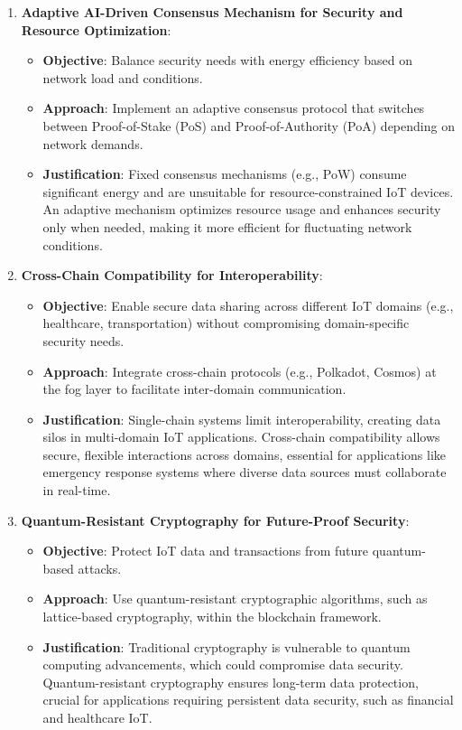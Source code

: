 \documentclass[12pt, oneside]{report}
\begin{document}
\begin{enumerate}
    \item \textbf{Adaptive AI-Driven Consensus Mechanism for Security and Resource Optimization}:
    \begin{itemize}
        \item \textbf{Objective}: Balance security needs with energy efficiency based on network load and conditions.
        \item \textbf{Approach}: Implement an adaptive consensus protocol that switches between Proof-of-Stake (PoS) and Proof-of-Authority (PoA) depending on network demands.
        \item \textbf{Justification}: Fixed consensus mechanisms (e.g., PoW) consume significant energy and are unsuitable for resource-constrained IoT devices. An adaptive mechanism optimizes resource usage and enhances security only when needed, making it more efficient for fluctuating network conditions.
    \end{itemize}

    \item \textbf{Cross-Chain Compatibility for Interoperability}:
    \begin{itemize}
        \item \textbf{Objective}: Enable secure data sharing across different IoT domains (e.g., healthcare, transportation) without compromising domain-specific security needs.
        \item \textbf{Approach}: Integrate cross-chain protocols (e.g., Polkadot, Cosmos) at the fog layer to facilitate inter-domain communication.
        \item \textbf{Justification}: Single-chain systems limit interoperability, creating data silos in multi-domain IoT applications. Cross-chain compatibility allows secure, flexible interactions across domains, essential for applications like emergency response systems where diverse data sources must collaborate in real-time.
    \end{itemize}

    \item \textbf{Quantum-Resistant Cryptography for Future-Proof Security}:
    \begin{itemize}
        \item \textbf{Objective}: Protect IoT data and transactions from future quantum-based attacks.
        \item \textbf{Approach}: Use quantum-resistant cryptographic algorithms, such as lattice-based cryptography, within the blockchain framework.
        \item \textbf{Justification}: Traditional cryptography is vulnerable to quantum computing advancements, which could compromise data security. Quantum-resistant cryptography ensures long-term data protection, crucial for applications requiring persistent data security, such as financial and healthcare IoT.
    \end{itemize}



\end{enumerate}
\end{document}
